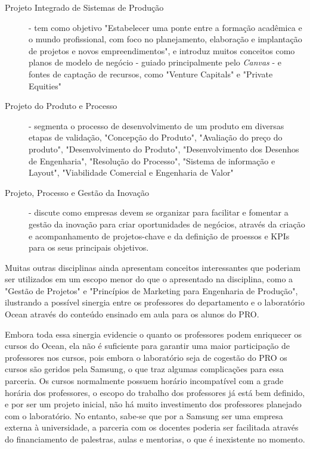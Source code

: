 \begin{description}
\item[Projeto Integrado de Sistemas de Produção] - tem como objetivo "Estabelecer uma ponte entre a formação acadêmica e o mundo profissional, com foco no planejamento, elaboração e implantação de projetos e novos empreendimentos", e introduz muitos conceitos como planos de modelo de negócio - guiado principalmente pelo \textit{Canvas} - e fontes de captação de recursos, como "Venture Capitals" e "Private Equities"

\item[Projeto do Produto e Processo] - segmenta o processo de desenvolvimento de um produto em diversas etapas de validação, "Concepção do Produto", "Avaliação do preço do produto", "Desenvolvimento do Produto", "Desenvolvimento dos Desenhos de Engenharia", "Resolução do Processo", "Sistema de informação e Layout", "Viabilidade Comercial e Engenharia de Valor"

\item[Projeto, Processo e Gestão da Inovação] - discute como empresas devem se organizar para facilitar e fomentar a gestão da inovação para criar oportunidades de negócios, através da criação e acompanhamento de projetos-chave e da definição de proessos e KPIs para os seus principais objetivos.

\end{description}

Muitas outras disciplinas ainda apresentam conceitos interessantes que poderiam ser utilizados em um escopo menor do que o apresentado na disciplina, como a "Gestão de Projetos" e "Princípios de Marketing para Engenharia de Produção", ilustrando a possível sinergia entre os professores do departamento e o laboratório Ocean através do conteúdo ensinado em aula para os alunos do PRO.

Embora toda essa sinergia evidencie o quanto os professores podem enriquecer os cursos do Ocean, ela não é suficiente para garantir uma maior participação de professores nos cursos, pois embora o laboratório seja de cogestão do PRO os cursos são geridos pela Samsung, o que traz algumas complicações para essa parceria. Os cursos normalmente possuem horário incompatível com a grade horária dos professores, o escopo do trabalho dos professores já está bem definido, e por ser um projeto inicial, não há muito investimento dos professores planejado com o laboratório. No entanto, sabe-se que por a Samsung ser uma empresa externa à universidade, a parceria com os docentes poderia ser facilitada através do financiamento de palestras, aulas e mentorias, o que é inexistente no momento.

